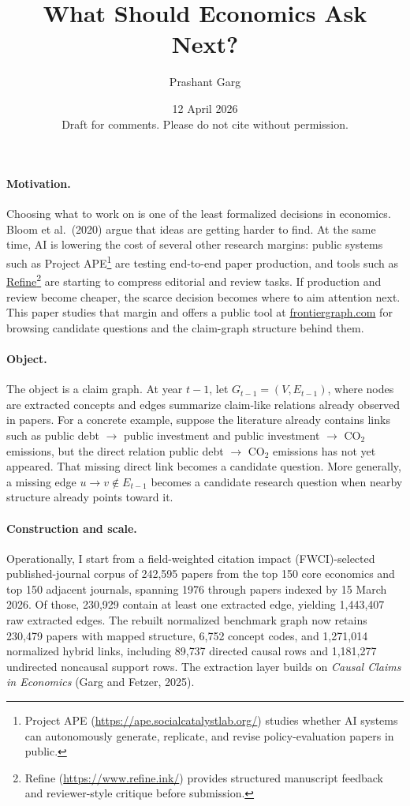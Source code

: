 \documentclass[11pt]{article}
\title{\textbf{What Should Economics Ask Next?}}
\author{Prashant Garg}
\date{12 April 2026\\[0.3em]\normalsize Draft for comments. Please do not cite without permission.}
\begin{document}
\maketitle
\onehalfspacing

\paragraph{Motivation.}
Choosing what to work on is one of the least formalized decisions in economics. Bloom et al.\ (2020) argue that ideas are getting harder to find. At the same time, AI is lowering the cost of several other research margins: public systems such as Project APE\footnote{Project APE (\url{https://ape.socialcatalystlab.org/}) studies whether AI systems can autonomously generate, replicate, and revise policy-evaluation papers in public.} are testing end-to-end paper production, and tools such as \href{https://www.refine.ink/}{Refine}\footnote{Refine (\url{https://www.refine.ink/}) provides structured manuscript feedback and reviewer-style critique before submission.} are starting to compress editorial and review tasks. If production and review become cheaper, the scarce decision becomes where to aim attention next. This paper studies that margin and offers a public tool at \href{https://frontiergraph.com/}{frontiergraph.com} for browsing candidate questions and the claim-graph structure behind them.

\paragraph{Object.}
The object is a claim graph. At year \(t-1\), let \(G_{t-1}=(V,E_{t-1})\), where nodes are extracted concepts and edges summarize claim-like relations already observed in papers. For a concrete example, suppose the literature already contains links such as public debt \(\rightarrow\) public investment and public investment \(\rightarrow\) CO\(_2\) emissions, but the direct relation public debt \(\rightarrow\) CO\(_2\) emissions has not yet appeared. That missing direct link becomes a candidate question. More generally, a missing edge \(u \rightarrow v \notin E_{t-1}\) becomes a candidate research question when nearby structure already points toward it.

\paragraph{Construction and scale.}
Operationally, I start from a field-weighted citation impact (FWCI)-selected published-journal corpus of 242{,}595 papers from the top 150 core economics and top 150 adjacent journals, spanning 1976 through papers indexed by 15 March 2026. Of those, 230{,}929 contain at least one extracted edge, yielding 1{,}443{,}407 raw extracted edges. The rebuilt normalized benchmark graph now retains 230{,}479 papers with mapped structure, 6{,}752 concept codes, and 1{,}271{,}014 normalized hybrid links, including 89{,}737 directed causal rows and 1{,}181{,}277 undirected noncausal support rows. The extraction layer builds on \textit{Causal Claims in Economics} (Garg and Fetzer, 2025).
\end{document}
